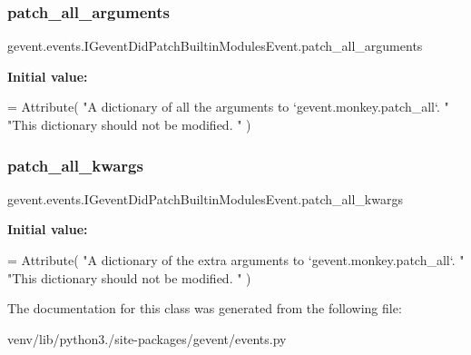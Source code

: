 \subsubsection{\texorpdfstring{patch\+\_\+all\+\_\+arguments}{patch\_all\_arguments}}
{\footnotesize\ttfamily gevent.\+events.\+I\+Gevent\+Did\+Patch\+Builtin\+Modules\+Event.\+patch\+\_\+all\+\_\+arguments\hspace{0.3cm}{\ttfamily [static]}}

{\bfseries Initial value\+:}
\begin{DoxyCode}
=  Attribute(
        \textcolor{stringliteral}{"A dictionary of all the arguments to `gevent.monkey.patch\_all`. "}
        \textcolor{stringliteral}{"This dictionary should not be modified. "}
    )
\end{DoxyCode}
\mbox{\label{classgevent_1_1events_1_1_i_gevent_did_patch_builtin_modules_event_ae156d36d31c4b8c719116fef327eebc1}} 
\subsubsection{\texorpdfstring{patch\+\_\+all\+\_\+kwargs}{patch\_all\_kwargs}}
{\footnotesize\ttfamily gevent.\+events.\+I\+Gevent\+Did\+Patch\+Builtin\+Modules\+Event.\+patch\+\_\+all\+\_\+kwargs\hspace{0.3cm}{\ttfamily [static]}}

{\bfseries Initial value\+:}
\begin{DoxyCode}
=  Attribute(
        \textcolor{stringliteral}{"A dictionary of the extra arguments to `gevent.monkey.patch\_all`. "}
        \textcolor{stringliteral}{"This dictionary should not be modified. "}
    )
\end{DoxyCode}


The documentation for this class was generated from the following file\+:\begin{DoxyCompactItemize}
\item 
venv/lib/python3./site-\/packages/gevent/events.\+py\end{DoxyCompactItemize}
